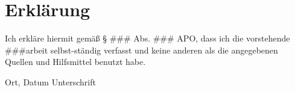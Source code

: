 \chapter*{Erklärung}
Ich erkläre hiermit gemäß § \#\#\# Abs. \#\#\# APO, dass ich die vorstehende \#\#\#arbeit  selbst-ständig verfasst und keine anderen als die angegebenen Quellen und Hilfsmittel benutzt habe.

\vspace{3cm}
Ort, Datum \hspace{5cm} Unterschrift\\
